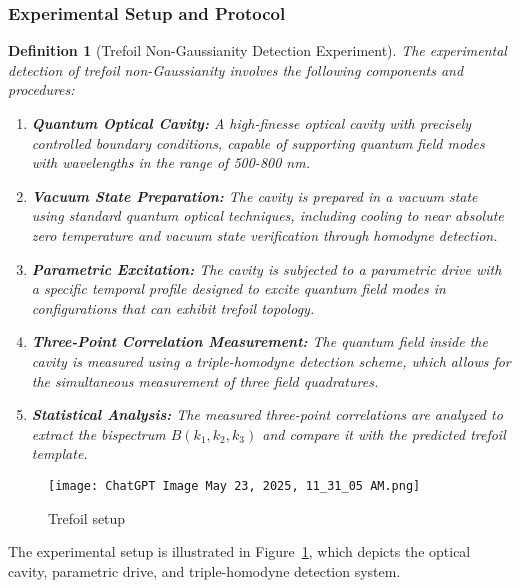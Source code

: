 \documentclass[11pt,a4paper]{article}
\newtheorem{definition}[theorem]{Definition}
\begin{document}
\subsubsection{Experimental Setup and Protocol}
\label{ssubsec:trefoil_experiment}

\begin{definition}[Trefoil Non-Gaussianity Detection Experiment]
\label{def:trefoil_experiment}
The experimental detection of trefoil non-Gaussianity involves the following components and procedures:

\begin{enumerate}
    \item \textbf{Quantum Optical Cavity:} A high-finesse optical cavity with precisely controlled boundary conditions, capable of supporting quantum field modes with wavelengths in the range of 500-800 nm.
    
    \item \textbf{Vacuum State Preparation:} The cavity is prepared in a vacuum state using standard quantum optical techniques, including cooling to near absolute zero temperature and vacuum state verification through homodyne detection.
    
    \item \textbf{Parametric Excitation:} The cavity is subjected to a parametric drive with a specific temporal profile designed to excite quantum field modes in configurations that can exhibit trefoil topology.
    
    \item \textbf{Three-Point Correlation Measurement:} The quantum field inside the cavity is measured using a triple-homodyne detection scheme, which allows for the simultaneous measurement of three field quadratures.
    
    \item \textbf{Statistical Analysis:} The measured three-point correlations are analyzed to extract the bispectrum $B(k_1, k_2, k_3)$ and compare it with the predicted trefoil template.
\end{enumerate}
\end{definition}
\begin{figure}
    \centering
    \texttt{[image: ChatGPT Image May 23, 2025, 11\_31\_05 AM.png]}
    \caption{Trefoil setup}
    \label{fig:trefoil_setup}
\end{figure}
The experimental setup is illustrated in Figure~\ref{fig:trefoil_setup}, which depicts the optical cavity, parametric drive, and triple-homodyne detection system.
\end{document}
